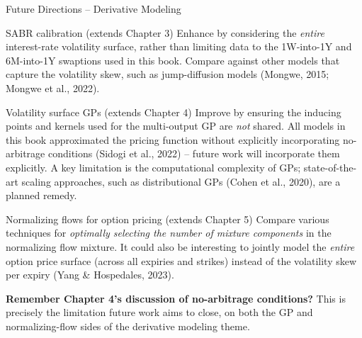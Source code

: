 \documentclass[aspectratio=169,10pt]{beamer}
\begin{document}
\begin{frame}[allowframebreaks]{Future Directions -- Derivative Modeling}
  \begin{block}{SABR calibration (extends Chapter 3)}
    Enhance by considering the \emph{entire} interest-rate volatility
    surface, rather than limiting data to the 1W-into-1Y and 6M-into-1Y
    swaptions used in this book. Compare against other models that
    capture the volatility skew, such as jump-diffusion models (Mongwe,
    2015; Mongwe et al., 2022).
  \end{block}
  \begin{block}{Volatility surface GPs (extends Chapter 4)}
    Improve by ensuring the inducing points and kernels used for the
    multi-output GP are \emph{not} shared. All models in this book
    approximated the pricing function without explicitly incorporating
    no-arbitrage conditions (Sidogi et al., 2022) -- future work will
    incorporate them explicitly. A key limitation is the computational
    complexity of GPs; state-of-the-art scaling approaches, such as
    distributional GPs (Cohen et al., 2020), are a planned remedy.
  \end{block}

  \framebreak

  \begin{block}{Normalizing flows for option pricing (extends Chapter 5)}
    Compare various techniques for \emph{optimally selecting the number
    of mixture components} in the normalizing flow mixture. It could
    also be interesting to jointly model the \emph{entire} option price
    surface (across all expiries and strikes) instead of the volatility
    skew per expiry (Yang \& Hospedales, 2023).
  \end{block}
  \textbf{Remember Chapter 4's discussion of no-arbitrage conditions?}
  This is precisely the limitation future work aims to close, on both
  the GP and normalizing-flow sides of the derivative modeling theme.
\end{frame}
\end{document}
